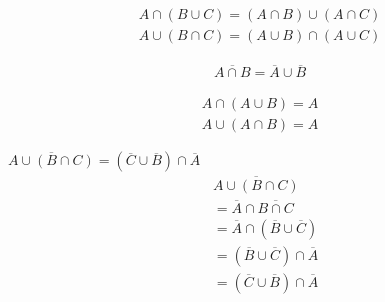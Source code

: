 \documentclass[12pt, openany, oneside]{book}
\begin{document}
\begin{tcolorbox}
	\begin{align}
		A \cap (B \cup C) = (A \cap B) \cup (A \cap C) \\
		A \cup (B \cap C) = (A \cup B) \cap (A \cup C)
	\end{align}
\end{tcolorbox}

\begin{tcolorbox}
	\begin{align}
		\overline{A \cap B} = \overline A \cup \overline B
	\end{align}
\end{tcolorbox}

\begin{tcolorbox}
	\begin{align}
		A \cap (A \cup B) = A \\
		A \cup (A \cap B) = A
	\end{align}
\end{tcolorbox}

\begin{tcolorbox}
	$ \overline{A \cup (B \cap C)} = (\overline C \cup \overline B) \cap \overline A $
	\begin{align*}
		 & \overline{A \cup (B \cap C)}                      \\
		 & = \overline A \cap \overline{B \cap C}            \\
		 & = \overline A \cap (\overline B \cup \overline C) \\
		 & = (\overline B \cup \overline C) \cap \overline A \\
		 & = (\overline C \cup \overline B) \cap \overline A
	\end{align*}
\end{tcolorbox}
\end{document}
